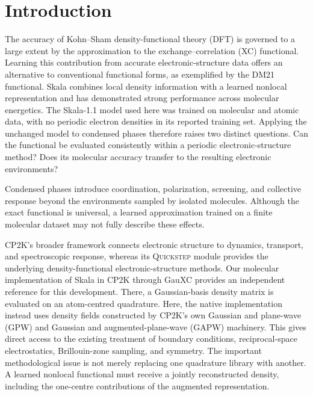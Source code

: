 \documentclass[10pt,a4paper,twocolumn]{article}
\begin{document}
\section{Introduction}

The accuracy of Kohn--Sham density-functional theory (DFT) is governed to a large extent by the approximation to the exchange--correlation (XC) functional.\cite{Kohn1999Nobel,Jones2015DFT} Learning this contribution from accurate electronic-structure data offers an alternative to conventional functional forms, as exemplified by the DM21 functional.\cite{Kirkpatrick2021DM21} Skala combines local density information with a learned nonlocal representation and has demonstrated strong performance across molecular energetics.\cite{Skala2025} The Skala-1.1 model used here was trained on molecular and atomic data, with no periodic electron densities in its reported training set.\cite{Skala2025,Ehlert2026ACC} Applying the unchanged model to condensed phases therefore raises two distinct questions. Can the functional be evaluated consistently within a periodic electronic-structure method? Does its molecular accuracy transfer to the resulting electronic environments?

Condensed phases introduce coordination, polarization, screening, and collective response beyond the environments sampled by isolated molecules. Although the exact functional is universal, a learned approximation trained on a finite molecular dataset may not fully describe these effects.

CP2K's broader framework connects electronic structure to dynamics, transport, and spectroscopic response,\cite{CP2KDynamics2026} whereas its \textsc{Quickstep} module provides the underlying density-functional electronic-structure methods.\cite{CP2K2020} Our molecular implementation of Skala in CP2K through GauXC provides an independent reference for this development.\cite{Poeschel2026MolecularSkala,Williams2020} There, a Gaussian-basis density matrix is evaluated on an atom-centred quadrature. Here, the native implementation instead uses density fields constructed by CP2K's own Gaussian and plane-wave (GPW) and Gaussian and augmented-plane-wave (GAPW) machinery.\cite{Lippert1997,Lippert1999,CP2KMadeSimple2026} This gives direct access to the existing treatment of boundary conditions, reciprocal-space electrostatics, Brillouin-zone sampling, and symmetry. The important methodological issue is not merely replacing one quadrature library with another. A learned nonlocal functional must receive a jointly reconstructed density, including the one-centre contributions of the augmented representation.
\end{document}
